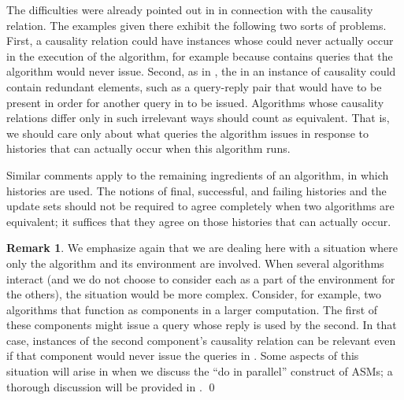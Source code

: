 \documentclass{LMCS}
\theoremstyle{definition}
\newtheorem{rmk}[thm]{Remark}
\begin{document}
The difficulties were already pointed out in \cite[Section~6]{oa1} in
connection with the causality relation.  The examples given there
exhibit the following two sorts of problems.  First, a causality
relation could have instances  whose  could never
actually occur in the execution of the algorithm, for example because
 contains queries that the algorithm would never issue.
Second, as in \cite[Example~6.4]{oa2}, the  in an instance
 of causality could contain redundant elements, such as
a query-reply pair that would have to be present in order for another
query in  to be issued.  Algorithms whose causality
relations differ only in such irrelevant ways should count as
equivalent.  That is, we should care only about what queries the
algorithm issues in response to histories that can actually occur when
this algorithm runs.

Similar comments apply to the remaining ingredients of an algorithm,
in which histories are used.  The notions of final, successful, and
failing histories and the update sets should not be required to agree
completely when two algorithms are equivalent; it suffices that they
agree on those histories that can actually occur.

\begin{rmk} \label{cpt2} We emphasize again that we are dealing here
  with a situation where only the algorithm and its environment are
  involved.  When several algorithms interact (and we do not choose to
  consider each as a part of the environment for the others), the
  situation would be more complex.  Consider, for example, two
  algorithms that function as components in a larger computation.  The
  first of these components might issue a query whose reply is used by
  the second.  In that case, instances  of the second
  component's causality relation can be relevant even if that
  component would never issue the queries in .  Some
  aspects of this situation will arise in \cite{ga2} when we discuss
  the ``do in parallel'' construct of ASMs; a thorough discussion will
  be provided in \cite{composite}.  \qed\end{rmk}
\end{document}
